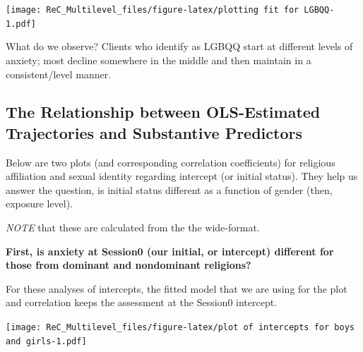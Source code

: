 \documentclass[
  english,
]{book}
\newenvironment{Shaded}{\begin{snugshade}}{\end{snugshade}}
\newcommand{\AttributeTok}[1]{\textcolor[rgb]{0.77,0.63,0.00}{#1}}
\newcommand{\CommentTok}[1]{\textcolor[rgb]{0.56,0.35,0.01}{\textit{#1}}}
\newcommand{\FunctionTok}[1]{\textcolor[rgb]{0.00,0.00,0.00}{#1}}
\newcommand{\NormalTok}[1]{#1}
\newcommand{\SpecialCharTok}[1]{\textcolor[rgb]{0.00,0.00,0.00}{#1}}
\newcommand{\StringTok}[1]{\textcolor[rgb]{0.31,0.60,0.02}{#1}}
\begin{document}
\texttt{[image: ReC\_Multilevel\_files/figure-latex/plotting fit for LGBQQ-1.pdf]}

What do we observe? Clients who identify as LGBQQ start at different levels of anxiety; most decline somewhere in the middle and then maintain in a consistent/level manner.

\hypertarget{the-relationship-between-ols-estimated-trajectories-and-substantive-predictors}{%
\subsection{The Relationship between OLS-Estimated Trajectories and Substantive Predictors}\label{the-relationship-between-ols-estimated-trajectories-and-substantive-predictors}}

Below are two plots (and corresponding correlation coefficients) for religious affiliation and sexual identity regarding intercept (or initial status). They help us answer the question, is initial status different as a function of gender (then, exposure level).

\emph{NOTE} that these are calculated from the the wide-format.

\textbf{First, is anxiety at Session0 (our initial, or intercept) different for those from dominant and nondominant religions?}

For these analyses of intercepts, the fitted model that we are using for the plot and correlation keeps the assessment at the Session0 intercept.

\begin{Shaded}
\end{Shaded}

\texttt{[image: ReC\_Multilevel\_files/figure-latex/plot of intercepts for boys and girls-1.pdf]}

\begin{Shaded}
\end{Shaded}
\end{document}
